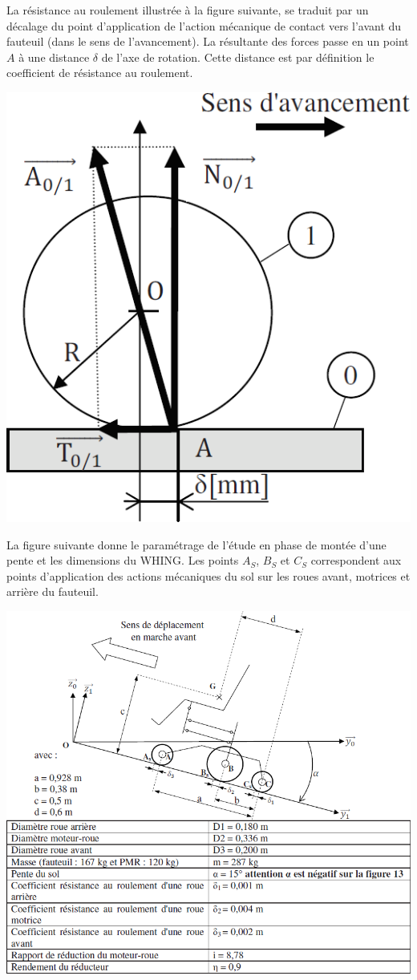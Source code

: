 \documentclass[10pt,fleqn]{article} %
\begin{document}
\begin{multicols}{2}
\begin{multicols}{2}
La résistance au roulement illustrée à la figure suivante, se traduit par un décalage du point
d'application de l'action mécanique de contact vers l'avant du fauteuil (dans le sens de l'avancement). La résultante des forces passe en un point $A$ à une distance $\delta$ de l'axe de rotation.
Cette distance est par définition le coefficient de résistance au roulement.


\begin{center}
\includegraphics[width=.5\linewidth]{images/fig_03}
\end{center}


La figure suivante donne le paramétrage de l'étude en phase de montée d'une pente et les dimensions du WHING. Les points $A_S$, $B_S$ et $C_S$  correspondent aux points d'application des actions mécaniques du sol sur les roues avant, motrices et arrière du fauteuil.


\begin{center}
\includegraphics[width=\linewidth]{images/fig_04}
\end{center}


\end{multicols}
\end{multicols}
\end{document}
